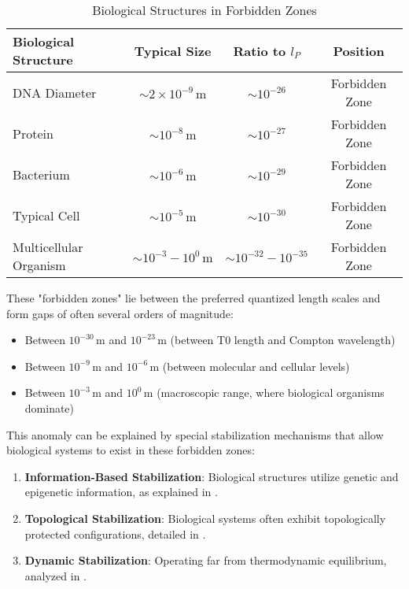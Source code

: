 \documentclass[12pt,a4paper]{article}
\begin{document}
	\begin{table}[H]
		\centering
		\begin{tabular}{lccc}
			\toprule
			\textbf{Biological Structure} & \textbf{Typical Size} & \textbf{Ratio to \(l_P\)} & \textbf{Position} \\
			\midrule
			DNA Diameter & \(\sim 2 \times 10^{-9} \, \text{m}\) & \(\sim 10^{-26}\) & Forbidden Zone \\
			Protein & \(\sim 10^{-8} \, \text{m}\) & \(\sim 10^{-27}\) & Forbidden Zone \\
			Bacterium & \(\sim 10^{-6} \, \text{m}\) & \(\sim 10^{-29}\) & Forbidden Zone \\
			Typical Cell & \(\sim 10^{-5} \, \text{m}\) & \(\sim 10^{-30}\) & Forbidden Zone \\
			Multicellular Organism & \(\sim 10^{-3} - 10^{0} \, \text{m}\) & \(\sim 10^{-32} - 10^{-35}\) & Forbidden Zone \\
			\bottomrule
		\end{tabular}
		\caption{Biological Structures in Forbidden Zones}
		\label{tab:biological_anomalies}
	\end{table}
	
	These "forbidden zones" lie between the preferred quantized length scales and form gaps of often several orders of magnitude:
	\begin{itemize}
		\item Between \(10^{-30} \, \text{m}\) and \(10^{-23} \, \text{m}\) (between T0 length and Compton wavelength)
		\item Between \(10^{-9} \, \text{m}\) and \(10^{-6} \, \text{m}\) (between molecular and cellular levels)
		\item Between \(10^{-3} \, \text{m}\) and \(10^{0} \, \text{m}\) (macroscopic range, where biological organisms dominate)
	\end{itemize}
	
	This anomaly can be explained by special stabilization mechanisms that allow biological systems to exist in these forbidden zones:
	
	\begin{enumerate}
		\item \textbf{Information-Based Stabilization}: Biological structures utilize genetic and epigenetic information, as explained in \cite{pascher_bio_2025}.
		\item \textbf{Topological Stabilization}: Biological systems often exhibit topologically protected configurations, detailed in \cite{pascher_quantum_2025}.
		\item \textbf{Dynamic Stabilization}: Operating far from thermodynamic equilibrium, analyzed in \cite{pascher_galaxies_2025}.
	\end{enumerate}
	
\end{document}
